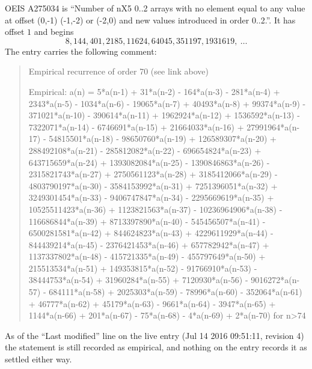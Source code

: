 \documentclass[11pt,a4paper]{article}
\theoremstyle{plain}
\theoremstyle{definition}
\begin{document}
OEIS A275034 is ``Number of nX5 0..2 arrays with no element equal to any value at offset (0,-1) (-1,-2) or (-2,0) and new values introduced in order 0..2.''. It has offset $1$ and begins
\[
8, 144, 401, 2185, 11624, 64045, 351197, 1931619,\ \dots
\]
The entry carries the following comment:
\begin{quote}\small
Empirical recurrence of order 70 (see link above)

Empirical: a(n) = 5*a(n-1) + 31*a(n-2) - 164*a(n-3) - 281*a(n-4) + 2343*a(n-5) - 1034*a(n-6) - 19065*a(n-7) + 40493*a(n-8) + 99374*a(n-9) - 371021*a(n-10) - 390614*a(n-11) + 1962924*a(n-12) + 1536592*a(n-13) - 7322071*a(n-14) - 6746691*a(n-15) + 21664033*a(n-16) + 27991964*a(n-17) - 54815501*a(n-18) - 98650760*a(n-19) + 126589307*a(n-20) + 288492108*a(n-21) - 285812082*a(n-22) - 696654824*a(n-23) + 643715659*a(n-24) + 1393082084*a(n-25) - 1390846863*a(n-26) - 2315821743*a(n-27) + 2750561123*a(n-28) + 3185412066*a(n-29) - 4803790197*a(n-30) - 3584153992*a(n-31) + 7251396051*a(n-32) + 3249301454*a(n-33) - 9406747847*a(n-34) - 2295669619*a(n-35) + 10525511423*a(n-36) + 1123821563*a(n-37) - 10236964906*a(n-38) - 116686844*a(n-39) + 8713397890*a(n-40) - 545456507*a(n-41) - 6500281581*a(n-42) + 844624823*a(n-43) + 4229611929*a(n-44) - 844439214*a(n-45) - 2376421453*a(n-46) + 657782942*a(n-47) + 1137337802*a(n-48) - 415721335*a(n-49) - 455797649*a(n-50) + 215513534*a(n-51) + 149353815*a(n-52) - 91766910*a(n-53) - 38444753*a(n-54) + 31960284*a(n-55) + 7120930*a(n-56) - 9016272*a(n-57) - 684111*a(n-58) + 2025303*a(n-59) - 78996*a(n-60) - 352064*a(n-61) + 46777*a(n-62) + 45179*a(n-63) - 9661*a(n-64) - 3947*a(n-65) + 1144*a(n-66) + 201*a(n-67) - 75*a(n-68) - 4*a(n-69) + 2*a(n-70) for n>74
\end{quote}
As of the ``Last modified'' line on the live entry (Jul 14 2016 09:51:11, revision 4) the statement is
still recorded as empirical, and nothing on the entry records it as settled either way.
\end{document}

